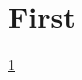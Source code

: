 \documentclass{scrartcl}
\begin{document}
      \section{First} \label{sec:first}
      \cite{test}

      \ref{sec:first}
      
    
\end{document}
